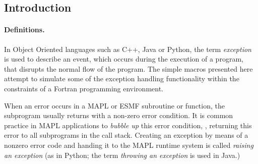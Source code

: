 %  
%  
%  

\def\m#1{{\tt \_\_#1\_\_}}
\def\f#1#2{{\tt \_\_#1\_\_(#2)}}

\subsection*{Introduction}

\paragraph{Definitions.} In Object Oriented languages such as C++, Java or
Python, the term {\em exception} is used to describe an event, which
occurs during the execution of a program, that disrupts the normal
flow of the program. The simple macros presented here attempt to
simulate some of the exception handling functionality within the
constraints of a Fortran programming environment.

When an error occurs in a MAPL or ESMF subroutine or function, the
subprogram usually returns with a non-zero error condition. It is
common practice in MAPL applications to {\em bubble up} this error
condition, , returning this error to all subprograms in the call
stack. Creating an exception by means of a nonzero error code and
handing it to the MAPL runtime system is called {\em raising an exception}
(as in Python; the term {\em throwing an exception} is used in Java.)

